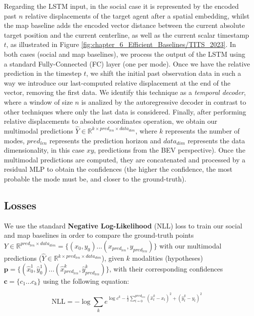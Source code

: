 Regarding the LSTM input, in the social case it is represented by the encoded past $n$ relative displacements of the target agent after a spatial embedding, whilst the map baseline adds the encoded vector distance between the current absolute target position and the current centerline, as well as the current scalar timestamp $t$, as illustrated in Figure \ref{fig:chapter_6_Efficient_Baselines/TITS_2023}. In both cases (social and map baselines), we process the output of the LSTM using a standard Fully-Connected (FC) layer (one per mode). Once we have the relative prediction in the timestep $t$, we shift the initial past observation data in such a way we introduce our last-computed relative displacement at the end of the vector, removing the first data. We identify this technique as a \textit{temporal decoder}, where a window of size $n$ is analized by the autoregressive decoder in contrast to other techniques \cite{dendorfer2020goal, sadeghian2019sophie, gupta2018social} where only the last data is considered. Finally, after performing relative displacements to absolute coordinates operation, we obtain our multimodal predictions $\hat{Y} \in \mathbb{R}^{k \times pred_{len} \times data_{dim}}$, where $k$ represents the number of modes, $pred_{len}$ represents the prediction horizon and $data_{dim}$ represents the data dimensionality, in this case $xy$, predictions from the BEV perspective). Once the multimodal predictions are computed, they are concatenated and processed by a residual MLP to obtain the confidences (the higher the confidence, the most probable the mode must be, and closer to the ground-truth).

\subsection{Losses}
\label{subsec:6_efficient_baselines_losses}

We use the standard \textbf{Negative Log-Likelihood} (NLL) loss to train our social and map baselines in order to compare the ground-truth points $Y \in \mathbb{R}^{pred_{len} \times data_{dim}} = \{(x_0,y_0) ... (x_{pred_{len}}, y_{pred_{len}})\}$ with our multimodal predictions ($\hat{Y} \in \mathbb{R}^{k \times pred_{len} \times data_{dim}}$), given $k$ modalities (hypotheses) $\mathbf{p}=\{(\hat{x}^1_0,\hat{y}^1_0) ... (\hat{x}^k_{pred_{len}}, \hat{y}^k_{pred_{len}})\}$, with their corresponding confidences $\mathbf{c}=\{c_1 ... c_k\}$ using the following equation:

\begin{equation}
	\text{NLL} = -\log \sum_{k} e^{ \log{c^k} - \frac{1}{2} \sum_{t=0}^{pred_{len}} (\hat{x}^k_t - x_t)^2 + (\hat{y}^k_t - y_t )^2 }
	\label{eq:nll}
\end{equation}

